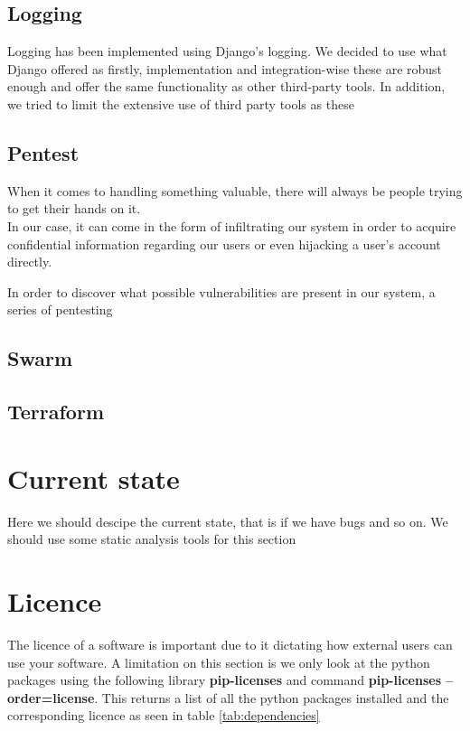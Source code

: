 \subsection*{Logging}
Logging has been implemented using Django's logging. We decided to use what Django offered as firstly, implementation and integration-wise these are robust enough and offer the same functionality as other third-party tools. In addition, we tried to limit the extensive use of third party tools as these



\subsection*{Pentest}
When it comes to handling something valuable, there will always be people trying to get their hands on it.\\
In our case, it can come in the form of infiltrating our system in order to acquire confidential information regarding our users or even hijacking a user's account directly.\par
In order to discover what possible vulnerabilities are present in our system, a series of pentesting

\subsection*{Swarm}

\subsection*{Terraform}


\section*{Current state}

Here we should descipe the current state, that is if we have bugs and so on. We should use some static analysis tools for this section


\section*{Licence}

The licence of a software is important due to it dictating how external users can use your software. A limitation on this section is we only look at the python packages using the following library \textbf{pip-licenses} and command \textbf{ pip-licenses --order=license}. This returns a list of all the python packages installed and the corresponding licence as seen in table \ref{tab:dependencies}

